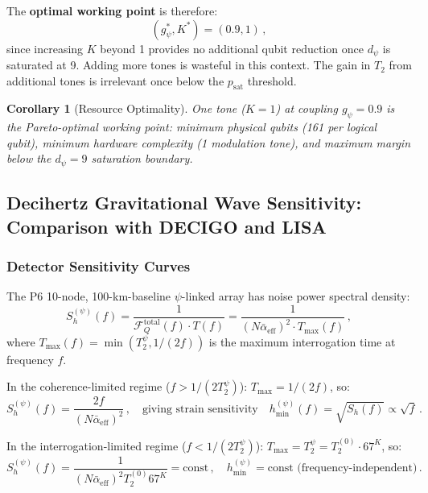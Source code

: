 \documentclass[11pt]{article}
\newtheorem{corollary}[theorem]{Corollary}
\theoremstyle{definition}
\theoremstyle{remark}
\begin{document}
The \textbf{optimal working point} is therefore:
\begin{equation}
(g_\psi^*, K^*) = (0.9, 1)\,,
\label{eq:optimal-wp}
\end{equation}
since increasing $K$ beyond 1 provides no additional qubit reduction once
$d_\psi$ is saturated at 9. Adding more tones is wasteful in this context.
The gain in $T_2$ from additional tones is irrelevant once below the
$p_{\mathrm{sat}}$ threshold.

\begin{corollary}[Resource Optimality]
One tone ($K = 1$) at coupling $g_\psi = 0.9$ is the Pareto-optimal
working point: minimum physical qubits (161 per logical qubit), minimum
hardware complexity (1 modulation tone), and maximum margin below the
$d_\psi = 9$ saturation boundary.
\end{corollary}

\subsection{Decihertz Gravitational Wave Sensitivity: Comparison with DECIGO
and LISA}
\label{sec:decigo}

\subsubsection{Detector Sensitivity Curves}

The P6 10-node, 100-km-baseline $\psi$-linked array has noise power spectral
density:
\begin{equation}
S_h^{(\psi)}(f) = \frac{1}{\mathcal{F}_Q^{\mathrm{total}}(f) \cdot T(f)}
= \frac{1}{(N\bar{\alpha}_{\mathrm{eff}})^2 \cdot T_{\max}(f)}\,,
\label{eq:Sh-psi}
\end{equation}
where $T_{\max}(f) = \min(T_2^\psi, 1/(2f))$ is the maximum interrogation
time at frequency $f$.

In the coherence-limited regime ($f > 1/(2T_2^\psi)$): $T_{\max} = 1/(2f)$, so:
\begin{equation}
S_h^{(\psi)}(f) = \frac{2f}{(N\bar{\alpha}_{\mathrm{eff}})^2}\,,
\quad\text{giving strain sensitivity}\quad
h_{\min}^{(\psi)}(f) = \sqrt{S_h(f)} \propto \sqrt{f}\,.
\end{equation}

In the interrogation-limited regime ($f < 1/(2T_2^\psi)$):
$T_{\max} = T_2^\psi = T_2^{(0)}\cdot 67^K$, so:
\begin{equation}
S_h^{(\psi)}(f) = \frac{1}{(N\bar{\alpha}_{\mathrm{eff}})^2 T_2^{(0)} 67^K}
= \text{const}\,,
\quad h_{\min}^{(\psi)} = \text{const (frequency-independent)}\,.
\end{equation}
\end{document}
